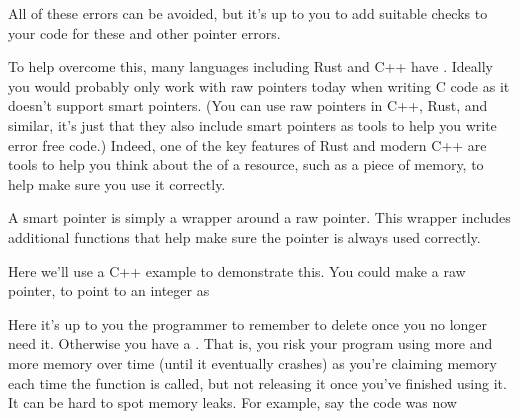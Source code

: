 \documentclass[letterpaper,10pt,british]{sphinxmanual}
\begin{document}
\sphinxAtStartPar
All of these errors can be avoided, but it’s up to you to add suitable checks to your code for these and other pointer errors.

\sphinxAtStartPar
To help overcome this, many languages including Rust and C++ have . Ideally you would probably only work with raw pointers today when writing C code as it doesn’t support smart pointers. (You can use raw pointers in C++, Rust, and similar, it’s just that they also include smart pointers as tools to help you write error free code.) Indeed, one of the key features of Rust and modern C++ are tools to help you think about the  of a resource, such as a piece of memory, to help make sure you use it correctly.

\sphinxAtStartPar
A smart pointer is simply a wrapper around a raw pointer. This wrapper includes additional functions that help make sure the pointer is always used correctly.

\sphinxAtStartPar
Here we’ll use a C++ example to demonstrate this. You could make a raw pointer, to point to an integer as

\begin{sphinxVerbatim}[commandchars=\\\{\}]


\end{sphinxVerbatim}

\sphinxAtStartPar
Here it’s up to you the programmer to remember to delete  once you no longer need it. Otherwise you have a . That is, you risk your program using more and more memory over time (until it eventually crashes) as you’re claiming memory each time the function is called, but not releasing it once you’ve finished using it. It can be hard to spot memory leaks. For example, say the code was now
\end{document}
